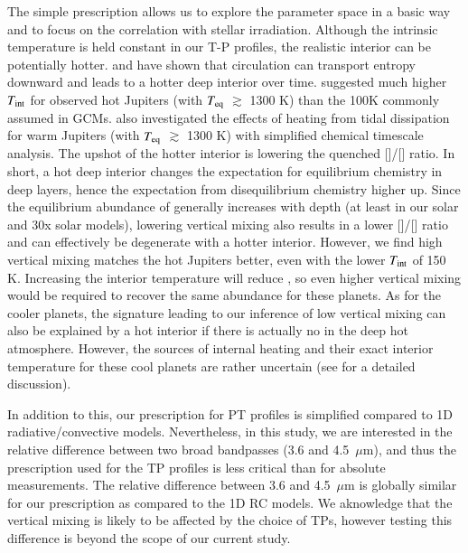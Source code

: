 The simple prescription allows us to explore the parameter space in a basic way and to focus on the correlation with stellar irradiation. Although the intrinsic temperature is held constant in our T-P profiles, the realistic interior can be potentially hotter. \citet{Tremblin2017} and \citet{Sainsbury-Martinez2019} have shown that circulation can transport entropy downward and leads to a hotter deep interior over time. \citet{Thorngren2019} suggested much higher $T_{\rm int}$ for observed hot Jupiters (with $T_{\rm eq}$ $\gtrsim$ 1300 K) than the 100K commonly assumed in GCMs. \citet{Fortney2020} also investigated the effects of heating from tidal dissipation for warm Jupiters (with $T_{\rm eq}$ $\gtrsim$ 1300 K) with simplified chemical timescale analysis. The upshot of the hotter interior is lowering the quenched []/[] ratio. In short, a hot deep interior changes the expectation for equilibrium chemistry in deep layers, hence the expectation from disequilibrium chemistry higher up. Since the equilibrium abundance of  generally increases with depth (at least in our solar and 30x solar models), lowering vertical mixing also results in a lower []/[] ratio and can effectively be degenerate with a hotter interior. However, we find high vertical mixing matches the hot Jupiters better, even with the lower $T_{\rm int}$ of 150 K. Increasing the interior temperature will reduce , so even higher vertical mixing would be required to recover the same  abundance for these planets. As for the cooler planets, the signature leading to our inference of low vertical mixing can also be explained by a hot interior if there is actually no  in the deep hot atmosphere. However, the sources of internal heating and their exact interior temperature for these cool planets are rather uncertain (see \citet{Fortney2020} for a  detailed discussion).

In addition to this, our prescription for PT profiles is simplified compared to 1D radiative/convective models. Nevertheless, in this study, we are interested in the relative difference between two broad bandpasses (3.6 and 4.5~$\mu$m), and thus the prescription used for the TP profiles is less critical than for absolute measurements. The relative difference between 3.6 and 4.5~$\mu$m is globally similar for our prescription as compared to the 1D RC models. We aknowledge that the vertical mixing is likely to be affected by the choice of TPs, however testing this difference is beyond the scope of our current study.

